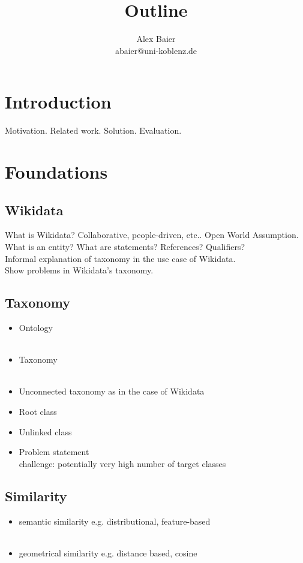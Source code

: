 \documentclass{scrartcl} %
\title{Outline}
\author{Alex Baier \\ abaier@uni-koblenz.de}
\begin{document}
\maketitle

\section{Introduction}
Motivation. Related work. Solution. Evaluation.

\section{Foundations}

\subsection{Wikidata}
What is Wikidata? Collaborative, people-driven, etc..
Open World Assumption.\\
What is an entity? What are statements? References? Qualifiers?\\
Informal explanation of taxonomy in the use case of Wikidata. \\
Show problems in Wikidata's taxonomy.\\
\citeauthor{Galarraga2016} \cite{Galarraga2016}

\subsection{Taxonomy}
\begin{itemize}
\item Ontology\\
	\citeauthor{Cimiano2009} \cite{Cimiano2009}\\
	\citeauthor{Galarraga2016} \cite{Galarraga2016}
\item Taxonomy\\
	\citeauthor{Cimiano2009} \cite{Cimiano2009}\\
	\citeauthor{Galarraga2016} \cite{Galarraga2016}
\item Unconnected taxonomy as in the case of Wikidata
\item Root class
\item Unlinked class
\item Problem statement\\
	challenge: potentially very high number of target classes
\end{itemize}

\subsection{Similarity}
\begin{itemize}
\item semantic similarity e.g. distributional, feature-based \\
	\citeauthor{Lin1998} \cite{Lin1998} \\
	\citeauthor{Rodriguez2003} \cite{Rodriguez2003}
\item geometrical similarity e.g. distance based, cosine
\end{itemize}
\end{document}

